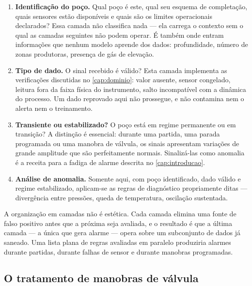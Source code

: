 \begin{enumerate}[leftmargin=*,itemsep=0.5em]

\item \textbf{Identificação do poço.} Qual poço é este, qual seu esquema de completação,
quais sensores estão disponíveis e quais são os limites operacionais declarados? Essa
camada não classifica nada --- ela carrega o contexto sem o qual as camadas seguintes
não podem operar. É também onde entram informações que nenhum modelo aprende dos dados:
profundidade, número de zonas produtoras, presença de gás de elevação.

\item \textbf{Tipo de dado.} O sinal recebido é válido? Esta camada implementa as
verificações discutidas no \cref{cap:dominio}: valor ausente, sensor congelado, leitura
fora da faixa física do instrumento, salto incompatível com a dinâmica do processo. Um
dado reprovado aqui não prossegue, e não contamina nem o alerta nem o treinamento.

\item \textbf{Transiente ou estabilizado?} O poço está em regime permanente ou em
transição? A distinção é essencial: durante uma partida, uma parada programada ou uma
manobra de válvula, os sinais apresentam variações de grande amplitude que são
perfeitamente normais. Sinalizá-las como anomalia é a receita para a fadiga de alarme
descrita no \cref{cap:introducao}.

\item \textbf{Análise de anomalia.} Somente aqui, com poço identificado, dado válido e
regime estabilizado, aplicam-se as regras de diagnóstico propriamente ditas ---
divergência entre pressões, queda de temperatura, oscilação sustentada.

\end{enumerate}

\begin{destaque}
A organização em camadas não é estética. Cada camada elimina uma fonte de falso
positivo antes que a próxima seja avaliada, e o resultado é que a última camada ---
a única que gera alarme --- opera sobre um subconjunto de dados já saneado. Uma lista
plana de regras avaliadas em paralelo produziria alarmes durante partidas, durante
falhas de sensor e durante manobras programadas.
\end{destaque}

\subsection{O tratamento de manobras de válvula}

